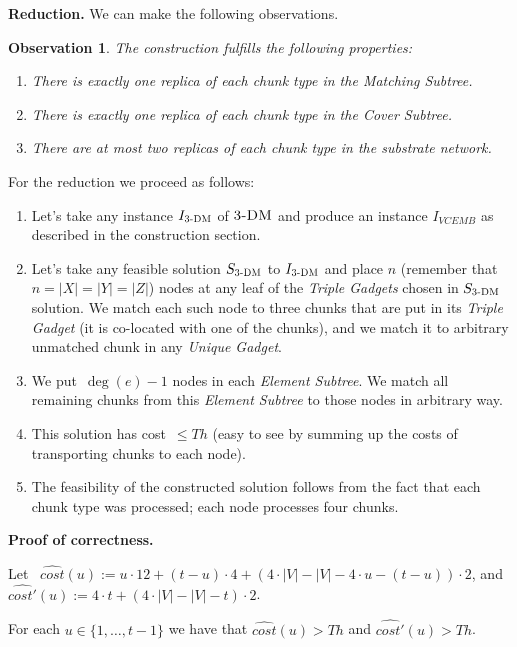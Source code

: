 \documentclass[preprint,12pt]{elsarticle}
\newcommand{\CostEstimOne}{\widehat{cost}}
\newcommand{\CostEstimTwo}{\widehat{cost'}}
\newcommand{\numNodes}{\ensuremath{|V|}}
\newcommand{\MatchSubtree}{{\emph{Matching Subtree}}}
\newcommand{\CoverSubtree}{{\emph{Cover Subtree}}}
\newcommand{\TripleGadget}{{\emph{Triple Gadget}}}
\newcommand{\TripleGadgets}{{\emph{Triple Gadgets}}}
\newcommand{\UnqGadget}{{\emph{Unique Gadget}}}
\newtheorem{obs}{Observation}
\newcommand{\TDM}{\textsc{3-DM}}
\newcommand{\Thr}{\ensuremath{Th}}
\begin{document}
\textbf{Reduction.}  We can make the following observations.

\begin{obs}
  The construction fulfills the following properties:
  \begin{enumerate}
    \item There is exactly one replica of each chunk type in the
    \MatchSubtree.

    \item There is exactly one replica of each chunk type in the
    \CoverSubtree.

    \item There are at most two replicas of each chunk type in the
    substrate network.
  \end{enumerate}
\end{obs}

For the reduction we proceed as follows:
\begin{enumerate}
  \item Let's take any instance $I_{\TDM}$ of $\TDM$ and produce an instance $I_{VCEMB}$ as described in the construction section.
  \item Let's take any feasible solution $S_{\TDM}$ to $I_{\TDM}$ and place $n$ (remember that~$n=|X|=|Y|=|Z|$) nodes at any leaf
  of the {\TripleGadgets} chosen in $S_{\TDM}$ solution. We
  match each such node to three chunks that are put in its
  {\TripleGadget} (it is co-located with one of the chunks), and we match it to
  arbitrary unmatched chunk in any \UnqGadget.
  \item We put~$\deg(e)-1$ nodes in each \emph{Element Subtree}. We match all
  remaining chunks from this \emph{Element Subtree} to those nodes in
  arbitrary way.
  \item This solution has cost~$\leq \Thr$ (easy to see by summing up the
  costs of transporting chunks to each node).
  \item The feasibility of the constructed solution follows from the
  fact that each chunk type was processed; each node processes four
  chunks.
\end{enumerate}

\textbf{Proof of correctness.}

  Let
 ~$\CostEstimOne(u) := u \cdot 12 + (t-u)\cdot 4 + (4\cdot \numNodes -
  \numNodes - 4\cdot u - (t-u))\cdot 2$, and 
$\CostEstimTwo(u) := 4\cdot t + (4\cdot
\numNodes - \numNodes - t)\cdot 2$.

\begin{lemma}
  For each $u \in \{ 1, \ldots, t-1 \}$ we have that $\CostEstimOne(u) > \Thr$ and
  $\CostEstimTwo(u) > \Thr$.
  \label{lem:cost-estims}
\end{lemma}
\end{document}
